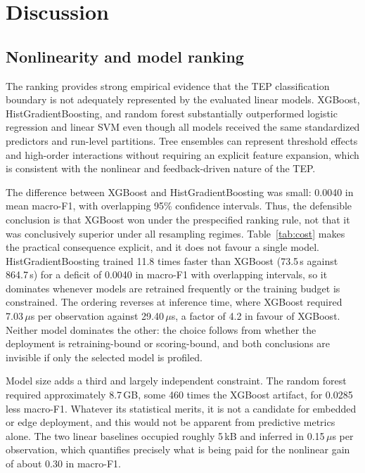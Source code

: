 \documentclass[10pt,twocolumn,a4paper]{article}
\begin{document}
\section{Discussion}

\subsection{Nonlinearity and model ranking}
\label{sec:nonlinearity}

The ranking provides strong empirical evidence that the TEP classification
boundary is not adequately represented by the evaluated linear models.
XGBoost, HistGradientBoosting, and random forest substantially outperformed
logistic regression and linear SVM even though all models received the same
standardized predictors and run-level partitions. Tree ensembles can represent
threshold effects and high-order interactions without requiring an explicit
feature expansion, which is consistent with the nonlinear and feedback-driven
nature of the TEP.

The difference between XGBoost and HistGradientBoosting was small: 0.0040 in
mean macro-F1, with overlapping 95\% confidence intervals. Thus, the defensible
conclusion is that XGBoost won under the prespecified ranking rule, not that it
was conclusively superior under all resampling regimes. Table~\ref{tab:cost}
makes the practical consequence explicit, and it does not favour a single
model. HistGradientBoosting trained 11.8 times faster than XGBoost (73.5\,s
against 864.7\,s) for a deficit of 0.0040 in macro-F1 with overlapping
intervals, so it dominates whenever models are retrained frequently or the
training budget is constrained. The ordering reverses at inference time, where
XGBoost required 7.03\,$\mu$s per observation against 29.40\,$\mu$s, a factor of
4.2 in favour of XGBoost. Neither model dominates the other: the choice follows
from whether the deployment is retraining-bound or scoring-bound, and both
conclusions are invisible if only the selected model is profiled.

Model size adds a third and largely independent constraint. The random forest
required approximately 8.7\,GB, some 460 times the XGBoost artifact, for
0.0285 less macro-F1. Whatever its statistical merits, it is not a candidate
for embedded or edge deployment, and this would not be apparent from predictive
metrics alone. The two linear baselines occupied roughly 5\,kB and inferred in
0.15\,$\mu$s per observation, which quantifies precisely what is being paid for
the nonlinear gain of about 0.30 in macro-F1.
\end{document}
